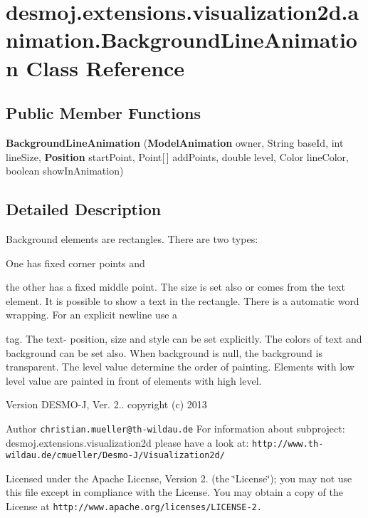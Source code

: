 \section{desmoj.\-extensions.\-visualization2d.\-animation.\-Background\-Line\-Animation Class Reference}
\label{classdesmoj_1_1extensions_1_1visualization2d_1_1animation_1_1_background_line_animation}
\subsection*{Public Member Functions}
\begin{DoxyCompactItemize}
\item 
{\bf Background\-Line\-Animation} ({\bf Model\-Animation} owner, String base\-Id, int line\-Size, {\bf Position} start\-Point, Point[$\,$] add\-Points, double level, Color line\-Color, boolean show\-In\-Animation)
\end{DoxyCompactItemize}


\subsection{Detailed Description}
Background elements are rectangles. There are two types\-:
\begin{DoxyItemize}
\item One has fixed corner points and
\item the other has a fixed middle point. The size is set also or comes from the text element. It is possible to show a text in the rectangle. There is a automatic word wrapping. For an explicit newline use a \par
 tag. The text-\/ position, size and style can be set explicitly. The colors of text and background can be set also. When background is null, the background is transparent. The level value determine the order of painting. Elements with low level value are painted in front of elements with high level.
\end{DoxyItemize}

\begin{DoxyVersion}{Version}
D\-E\-S\-M\-O-\/\-J, Ver. 2.. copyright (c) 2013 
\end{DoxyVersion}
\begin{DoxyAuthor}{Author}
{\tt christian.\-mueller@th-\/wildau.\-de} For information about subproject\-: desmoj.\-extensions.\-visualization2d please have a look at\-: {\tt http\-://www.\-th-\/wildau.\-de/cmueller/\-Desmo-\/\-J/\-Visualization2d/}
\end{DoxyAuthor}
Licensed under the Apache License, Version 2. (the \char`\"{}\-License\char`\"{}); you may not use this file except in compliance with the License. You may obtain a copy of the License at {\tt http\-://www.\-apache.\-org/licenses/\-L\-I\-C\-E\-N\-S\-E-\/2.}

